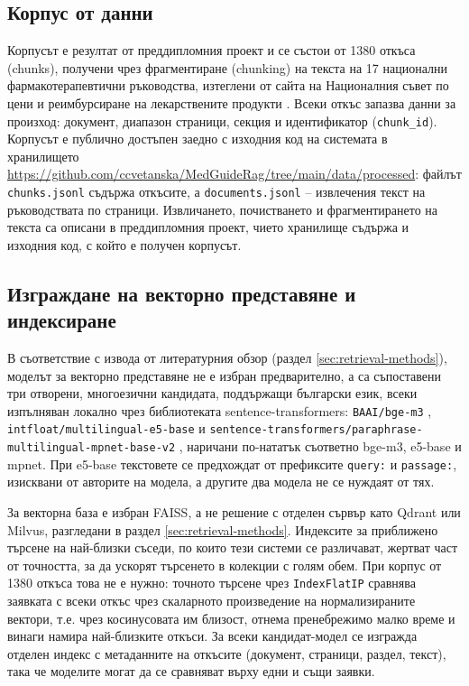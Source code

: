\documentclass[12pt,a4paper]{article}
\begin{document}
\subsection{Корпус от данни}
Корпусът е резултат от преддипломния проект \cite{pashovska2026pdp} и се състои от 1380 откъса (chunks), получени чрез фрагментиране (chunking) на текста на 17 национални фармакотерапевтични ръководства, изтеглени от сайта на Националния съвет по цени и реимбурсиране на лекарствените продукти \cite{ncpr_guidelines}. Всеки откъс запазва данни за произход: документ, диапазон страници, секция и идентификатор (\verb|chunk_id|). Корпусът е публично достъпен заедно с изходния код на системата в хранилището \url{https://github.com/ccvetanska/MedGuideRag/tree/main/data/processed}: файлът \nolinkurl{chunks.jsonl} съдържа откъсите, а \nolinkurl{documents.jsonl} -- извлечения текст на ръководствата по страници. Извличането, почистването и фрагментирането на текста са описани в преддипломния проект, чието хранилище съдържа и изходния код, с който е получен корпусът.

\subsection{Изграждане на векторно представяне и индексиране}
\label{sec:embedding-choice}
В съответствие с извода от литературния обзор (раздел \ref{sec:retrieval-methods}), моделът за векторно представяне не е избран предварително, а са съпоставени три отворени, многоезични кандидата, поддържащи български език, всеки изпълняван локално чрез библиотеката sentence-transformers: \nolinkurl{BAAI/bge-m3} \cite{chen2024bgem3}, \nolinkurl{intfloat/multilingual-e5-base} \cite{wang2024multilinguale5} и \nolinkurl{sentence-transformers/paraphrase-multilingual-mpnet-base-v2} \cite{reimers2020multilingual}, наричани по-нататък съответно bge-m3, e5-base и mpnet. При e5-base текстовете се предхождат от префиксите \texttt{query:} и \texttt{passage:}, изисквани от авторите на модела, а другите два модела не се нуждаят от тях.

За векторна база е избран FAISS, а не решение с отделен сървър като Qdrant или Milvus, разгледани в раздел \ref{sec:retrieval-methods}. Индексите за приближено търсене на най-близки съседи, по които тези системи се различават, жертват част от точността, за да ускорят търсенето в колекции с голям обем. При корпус от 1380 откъса това не е нужно: точното търсене чрез \texttt{IndexFlatIP} сравнява заявката с всеки откъс чрез скаларното произведение на нормализираните вектори, т.е. чрез косинусовата им близост, отнема пренебрежимо малко време и винаги намира най-близките откъси. За всеки кандидат-модел се изгражда отделен индекс с метаданните на откъсите (документ, страници, раздел, текст), така че моделите могат да се сравняват върху едни и същи заявки.
\end{document}
